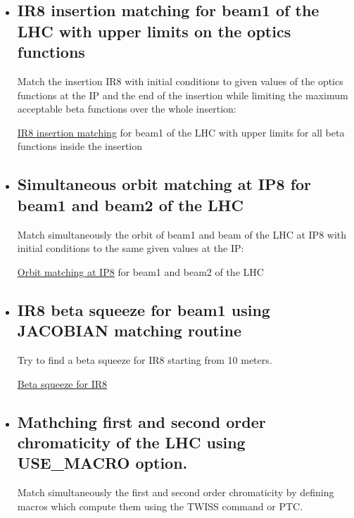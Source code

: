 \begin{itemize}
	\item \subsection{IR8 insertion matching for beam1 of the LHC with upper limits on the optics functions}
	Match the insertion IR8 with initial conditions to given values of the optics  functions at the IP and the end of the insertion while limiting the maximum acceptable beta functions over the whole insertion: 

\href{http://cern.ch/madx/madX/examples/match/lhc.insertion-upper/job.lhc.insertion-upper.madx}{IR8 insertion matching} for beam1 of the LHC with upper limits for all beta functions inside the insertion
	
	\item \subsection{Simultaneous orbit matching at IP8 for beam1 and beam2 of the LHC}
	Match simultaneously the orbit of beam1 and beam of the LHC at IP8  with initial conditions to the same given values at the IP: 

\href{http://cern.ch/madx/madX/examples/match/lhc.iporbit/job.lhc.iporbit.madx}{Orbit matching at IP8} for beam1 and beam2 of the LHC
	
	\item \subsection{IR8 beta squeeze for beam1 using JACOBIAN matching routine}
	Try to find a beta squeeze for IR8 starting from 10 meters. 

\href{http://cern.ch/madx/madX/examples/match/lhcV65.ir8squeeze/job.lhcV65.ir8squeeze.madx}{Beta squeeze for IR8}
	
	\item \subsection{Mathching first and second order chromaticity of the LHC using USE\_MACRO option.}
	Match simultaneously the first and second order chromaticity by defining macros which compute them using the TWISS command or PTC. 


\end{itemize}
